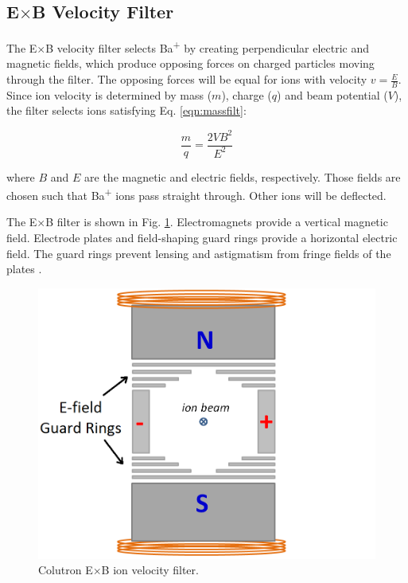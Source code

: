 \subsection{E$\times$B Velocity Filter}

The E$\times$B velocity filter selects Ba\textsuperscript{+} by creating perpendicular electric and magnetic fields, which produce opposing forces on charged particles moving through the filter.  The opposing forces will be equal for ions with velocity $v = \frac{E}{B}$.  Since ion velocity is determined by mass ($m$), charge ($q$) and beam potential ($V$), the filter selects ions satisfying Eq. \ref{eqn:massfilt}:

\begin{equation}
\frac{m}{q} = \frac{2 V B^{2}}{E^{2}}
\label{eqn:massfilt}
\end{equation}

\noindent
where $B$ and $E$ are the magnetic and electric fields, respectively.  Those fields are chosen such that Ba\textsuperscript{+} ions pass straight through.  Other ions will be deflected.  

The E$\times$B filter is shown in Fig. \ref{fig:exb}.  Electromagnets provide a vertical magnetic field.  Electrode plates and field-shaping guard rings provide a horizontal electric field.  The guard rings prevent lensing and astigmatism from fringe fields of the plates \cite{Colutron}.

\begin{figure}[h]
        \centering
                \includegraphics[width=.7\textwidth]{figures/ExB.png}
                \caption{Colutron E$\times$B ion velocity filter.}
\label{fig:exb}
\end{figure}


